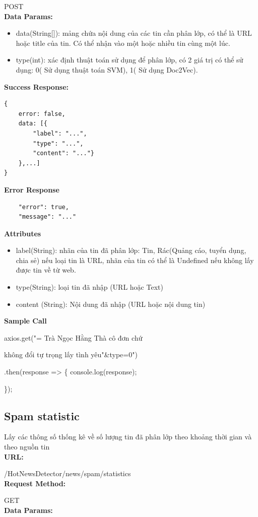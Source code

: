 POST\\
\textbf{Data Params:}
\begin{itemize}
	\item data(String[]): mảng chứa nội dung của các tin cần phân lớp, có thể là URL hoặc title của tin. Có thể nhận vào một hoặc nhiều tin cùng một lúc.
	\item type(int): xác định thuật toán sử dụng để phân lớp, có 2 giá trị có thể sử dụng: 0( Sử dụng thuật toán SVM), 1( Sử dụng Doc2Vec).
\end{itemize}
\textbf{Success Response:}
\begin{lstlisting}
{
	error: false,
	data: [{
		"label": "...",
		"type": "...",
		"content": "..."}
	},...]
}
\end{lstlisting}
\textbf{Error Response}
\begin{lstlisting}
	"error": true,		
	"message": "..."
\end{lstlisting}
\textbf{Attributes}
\begin{itemize}
	\item label(String):  nhãn của tin đã phân lớp: Tin, Rác(Quảng cáo, tuyển dụng, chia sẻ) nếu loại tin là URL, nhãn của tin có thể là Undefined nếu không lấy được tin về từ web.
	\item type(String):  loại tin đã nhập (URL hoặc Text)
	\item content (String):  Nội dung đã nhập (URL hoặc nội dung tin)
	
\end{itemize}
\textbf{Sample Call}

axios.get("{\color{blue}{/HotNewsDetector/news/spam?data}}= Trà Ngọc Hằng Thà cô đơn chứ 

không đổi tự trọng lấy tình yêu"\&type=0")

	.then(response => \{ console.log(response);
	
	\});
\subsection{Spam statistic}
Lấy các thông số thống kê về số lượng tin đã phân lớp theo khoảng thời gian và theo nguồn tin \\
\textbf{URL:} 

/HotNewsDetector/news/spam/statistics\\
\textbf{Request Method:}

GET\\
\textbf{Data Params:}

